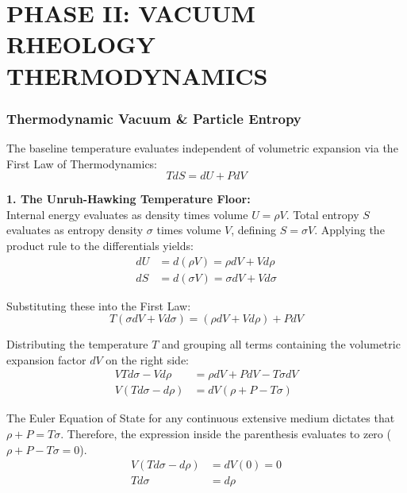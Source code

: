 \newpage

\part*{PHASE II: VACUUM RHEOLOGY THERMODYNAMICS}

\section{Thermodynamic Vacuum \& Particle Entropy}
\label{sec:deriv_thermo_vacuum}

The baseline temperature evaluates independent of volumetric expansion via the First Law of Thermodynamics: 
\begin{equation}
    T dS = dU + P dV \nonumber
\end{equation}

\textbf{1. The Unruh-Hawking Temperature Floor:} \\
Internal energy evaluates as density times volume $U = \rho V$. Total entropy $S$ evaluates as entropy density $\sigma$ times volume $V$, defining $S = \sigma V$. Applying the product rule to the differentials yields:
\begin{align}
    dU &= d(\rho V) = \rho dV + V d\rho  \\
    dS &= d(\sigma V) = \sigma dV + V d\sigma 
\end{align}

Substituting these into the First Law:
\begin{equation}
    T(\sigma dV + V d\sigma) = (\rho dV + V d\rho) + P dV 
\end{equation}

Distributing the temperature $T$ and grouping all terms containing the volumetric expansion factor $dV$ on the right side:
\begin{align}
    V T d\sigma - V d\rho &= \rho dV + P dV - T \sigma dV  \\
    V (T d\sigma - d\rho) &= dV (\rho + P - T \sigma) 
\end{align}

The Euler Equation of State for any continuous extensive medium dictates that $\rho + P = T \sigma$. Therefore, the expression inside the parenthesis evaluates to zero ($\rho + P - T \sigma = 0$). 
\begin{align}
    V (T d\sigma - d\rho) &= dV (0) = 0  \\
    T d\sigma &= d\rho 
\end{align}

